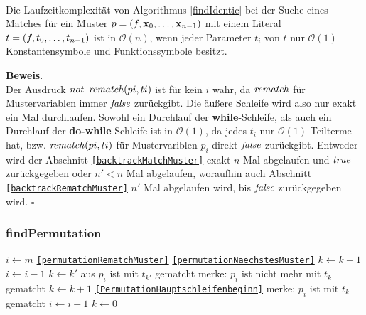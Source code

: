 \begin{lemma}\label{lemKomplexitaetFindPermutation}~\\
Die Laufzeitkomplexität von Algorithmus \ref{findIdentic} bei der Suche eines Matches für ein Muster $p = (f, {\mathbf x}_{0}, \dots, {\mathbf x}_{n-1})$ mit einem Literal $t = (f, {t}_{0}, \dots, {t}_{n-1})$ ist in $\mathcal O(n)$, wenn jeder Parameter $t_i$ von $t$ nur $\mathcal O(1)$ Konstantensymbole und Funktionssymbole besitzt.
\end{lemma}

\textbf{Beweis}.\\
Der Ausdruck $\mathit{not}$ $\mathit{rematch}(pi , ti)$ ist für kein $i$ wahr, da $\mathit{rematch}$ für Mustervariablen immer $\mathit{false}$ zurückgibt. Die äußere Schleife wird also nur exakt ein Mal durchlaufen. Sowohl ein Durchlauf der \textbf{while}-Schleife, als auch ein Durchlauf der \textbf{do-while}-Schleife ist in $\mathcal O(1)$, da jedes $t_i$ nur $\mathcal O(1)$ Teilterme hat, bzw. $\mathit{rematch}(pi , ti)$ für Mustervariblen $p_i$ direkt $\mathit{false}$ zurückgibt. Entweder wird der Abschnitt \texttt{\ref{backtrackMatchMuster}} exakt $n$ Mal abgelaufen und $\mathit{true}$ zurückgegeben oder $n' < n$ Mal abgelaufen, woraufhin auch Abschnitt \texttt{\ref{backtrackRematchMuster}} $n'$ Mal abgelaufen wird, bis $\mathit{false}$ zurückgegeben wird. 
\hfill $\square$\\



\subsubsection {findPermutation}
\begin{algorithm}
\DontPrintSemicolon
\caption{$\Const{findPermutation} \colon M \times T \times \mathit{Bool} \rightarrow \mathit{Bool}$}\label{findPermutation}
\;
 {
	$i \leftarrow m$\;
	\Goto \texttt{\ref{permutationRematchMuster}}\;
}
  {
 }
 \label{PermutationHauptschleifenbeginn}
  {
	 {
		 {
			 {
				\Goto \texttt{\ref{permutationNaechstesMuster}}\;
			}
		}
		$k \leftarrow k + 1$\;
	}
	\label{permutationRematchMuster}
	 {
	}
	$i \leftarrow i - 1$\;
	{$k \leftarrow k'$ aus \glqq $p_{i}$ ist mit $t_{k'}$ gematcht\grqq{}}\;
	 {
		merke: $p_{i}$ ist nicht mehr mit $t_{k}$ gematcht\;
		$k \leftarrow k + 1$\;
		\Goto \texttt{\ref{PermutationHauptschleifenbeginn}}\;
	} 
	\label{permutationNaechstesMuster}
	merke: $p_i$ ist mit $t_k$ gematcht\;
	$i \leftarrow i + 1$\;
	$k \leftarrow 0$\;    
 }
\end{algorithm}

